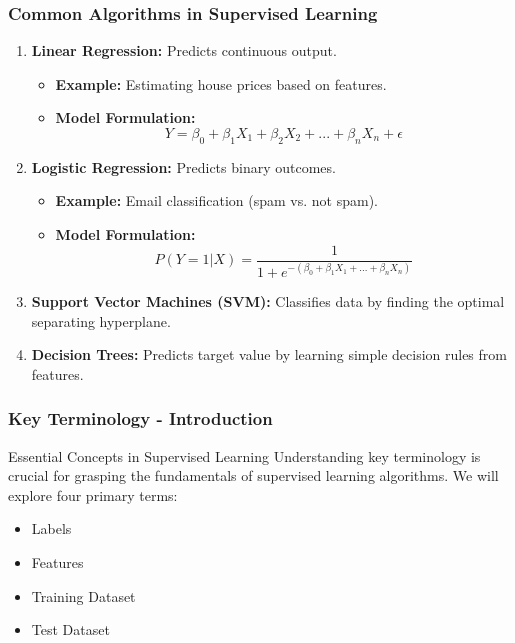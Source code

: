 \documentclass[aspectratio=169]{beamer}
\begin{document}
\begin{frame}[fragile]
    \frametitle{Common Algorithms in Supervised Learning}
    \begin{enumerate}
        \item \textbf{Linear Regression:} Predicts continuous output. 
            \begin{itemize}
                \item \textbf{Example:} Estimating house prices based on features.
                \item \textbf{Model Formulation:} 
                \begin{equation}
                Y = \beta_0 + \beta_1 X_1 + \beta_2 X_2 + ... + \beta_n X_n + \epsilon
                \end{equation}
            \end{itemize}
        
        \item \textbf{Logistic Regression:} Predicts binary outcomes.
            \begin{itemize}
                \item \textbf{Example:} Email classification (spam vs. not spam).
                \item \textbf{Model Formulation:}
                \begin{equation}
                P(Y=1|X) = \frac{1}{1 + e^{-(\beta_0 + \beta_1 X_1 + ... + \beta_n X_n)}}
                \end{equation}
            \end{itemize}
        
        \item \textbf{Support Vector Machines (SVM):} Classifies data by finding the optimal separating hyperplane.
        
        \item \textbf{Decision Trees:} Predicts target value by learning simple decision rules from features.
    \end{enumerate}
\end{frame}

\begin{frame}[fragile]
    \frametitle{Key Terminology - Introduction}
    \begin{block}{Essential Concepts in Supervised Learning}
        Understanding key terminology is crucial for grasping the fundamentals of supervised learning algorithms. 
        We will explore four primary terms: 
        \begin{itemize}
            \item Labels 
            \item Features 
            \item Training Dataset 
            \item Test Dataset 
        \end{itemize}
    \end{block}
\end{frame}
\end{document}
